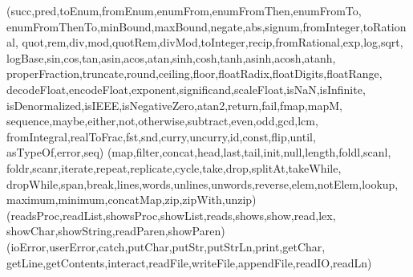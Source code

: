 \functions (succ,pred,toEnum,fromEnum,enumFrom,enumFromThen,enumFromTo,
 enumFromThenTo,minBound,maxBound,negate,abs,signum,fromInteger,toRational,
 quot,rem,div,mod,quotRem,divMod,toInteger,recip,fromRational,exp,log,sqrt,
 logBase,sin,cos,tan,asin,acos,atan,sinh,cosh,tanh,asinh,acosh,atanh,
 properFraction,truncate,round,ceiling,floor,floatRadix,floatDigits,floatRange,
 decodeFloat,encodeFloat,exponent,significand,scaleFloat,isNaN,isInfinite,
 isDenormalized,isIEEE,isNegativeZero,atan2,return,fail,fmap,mapM,
 sequence,maybe,either,not,otherwise,subtract,even,odd,gcd,lcm,
 fromIntegral,realToFrac,fst,snd,curry,uncurry,id,const,flip,until,
 asTypeOf,error,seq)
\functions (map,filter,concat,head,last,tail,init,null,length,foldl,scanl,
 foldr,scanr,iterate,repeat,replicate,cycle,take,drop,splitAt,takeWhile,
 dropWhile,span,break,lines,words,unlines,unwords,reverse,elem,notElem,lookup,
 maximum,minimum,concatMap,zip,zipWith,unzip)
\functions (readsProc,readList,showsProc,showList,reads,shows,show,read,lex,
 showChar,showString,readParen,showParen)
\functions (ioError,userError,catch,putChar,putStr,putStrLn,print,getChar,
 getLine,getContents,interact,readFile,writeFile,appendFile,readIO,readLn)


%
%

\chardef{}
\chardef{}
\chardef{}
\chardef{}
\chardef{}
\chardef{}
\chardef{}
\chardef{}
\chardef{}


